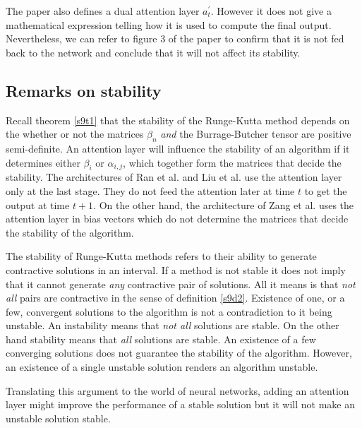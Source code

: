 \documentclass{article}
\numberwithin{equation}{section}
\begin{document}
The paper also defines a dual attention layer $a_t^\prime$. However it
does not give a mathematical expression telling how it is used to compute
the final output. Nevertheless, we can refer to figure 3 of the paper
\cite{liu2018table} to confirm that it is not fed back to the network 
and conclude that it will not affect its stability.

\subsection{Remarks on stability}
Recall theorem \ref{s9t1} that the stability of the Runge-Kutta method 
depends on the whether or not the matrices $\beta_n$ \emph{and} the 
Burrage-Butcher tensor are positive semi-definite. An attention layer will
influence the stability of an algorithm if it determines either $\beta_i$
or $\alpha_{i,j}$, which together form the matrices that decide the
stability. The architectures of Ran et al. and Liu et al. use the 
attention layer only at the last stage. They do not feed the attention
later at time $t$ to get the output at time $t + 1$. On the other hand, 
the architecture of Zang et al. uses the attention layer in bias vectors
which do not determine the matrices that decide the stability of the
algorithm.

The stability of Runge-Kutta methods refers to their ability to generate
contractive solutions in an interval. If a method is not stable it does not
imply that it cannot generate \emph{any} contractive pair of solutions. All
it means is that \emph{not all} pairs are contractive in the sense of 
definition \ref{s9d2}. Existence of one, or a few, convergent solutions to 
the algorithm is not a contradiction to it being unstable. An instability 
means that \emph{not all} solutions are stable. On the other hand stability 
means that \emph{all} solutions are stable. An existence of a few converging 
solutions does not guarantee the stability of the algorithm. However, an 
existence of a single unstable solution renders an algorithm unstable.

Translating this argument to the world of neural networks, adding an 
attention layer might improve the performance of a stable solution but it
will not make an unstable solution stable.
\end{document}

